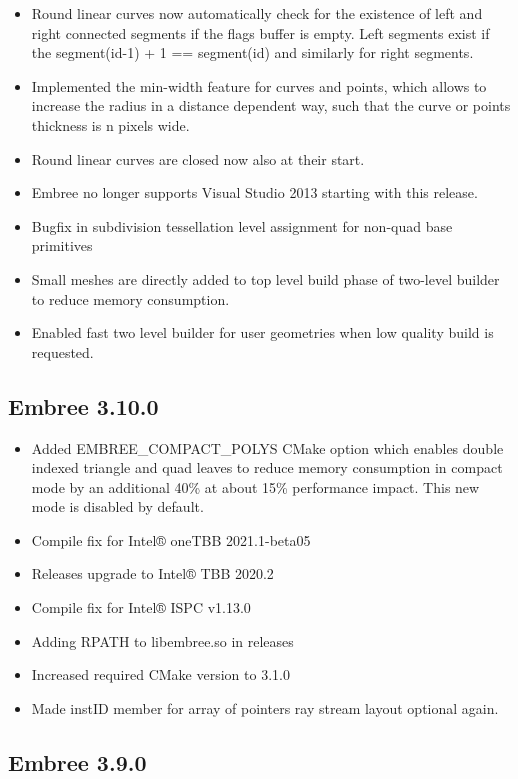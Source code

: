 \begin{itemize}
\tightlist
\item
  Round linear curves now automatically check for the existence of left
  and right connected segments if the flags buffer is empty. Left
  segments exist if the segment(id-1) + 1 == segment(id) and similarly
  for right segments.
\item
  Implemented the min-width feature for curves and points, which allows
  to increase the radius in a distance dependent way, such that the
  curve or points thickness is n pixels wide.
\item
  Round linear curves are closed now also at their start.
\item
  Embree no longer supports Visual Studio 2013 starting with this
  release.
\item
  Bugfix in subdivision tessellation level assignment for non-quad base
  primitives
\item
  Small meshes are directly added to top level build phase of two-level
  builder to reduce memory consumption.
\item
  Enabled fast two level builder for user geometries when low quality
  build is requested.
\end{itemize}

\subsection{Embree 3.10.0}\label{embree-3.10.0}

\begin{itemize}
\tightlist
\item
  Added EMBREE\_COMPACT\_POLYS CMake option which enables double indexed
  triangle and quad leaves to reduce memory consumption in compact mode
  by an additional 40\% at about 15\% performance impact. This new mode
  is disabled by default.
\item
  Compile fix for Intel® oneTBB 2021.1-beta05
\item
  Releases upgrade to Intel® TBB 2020.2
\item
  Compile fix for Intel® ISPC v1.13.0
\item
  Adding RPATH to libembree.so in releases
\item
  Increased required CMake version to 3.1.0
\item
  Made instID member for array of pointers ray stream layout optional
  again.
\end{itemize}

\subsection{Embree 3.9.0}\label{embree-3.9.0}

